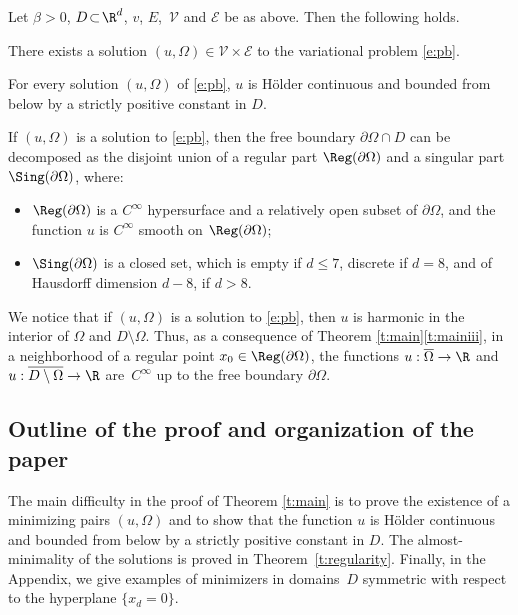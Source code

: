 \begin{teo}\label{t:main}
Let $\beta\!>\!0$, $D\!\subset\!\R^d$, $v$, $E$,~$\mathcal V$ and $\mathcal E$ be as above. Then the following holds.

\begin{enumeratei}
\item\label{t:maini} There exists a solution $(u,\Omega)\in\mathcal V\times\mathcal E$ to the variational problem \eqref{e:pb}.
\item For every solution $(u,\Omega)$ of \eqref{e:pb}, $u$ is Hölder continuous and bounded from below by a strictly positive constant in $D$.

\item\label{t:mainii} If $(u,\Omega)$ is a solution to \eqref{e:pb}, then the free boundary $\partial\Omega\cap D$ can be decomposed as the disjoint union of a regular part $\Reg(\partial\Omega)$ and a singular part $\Sing(\partial\Omega)$, where:
\begin{itemize}
\item\label{t:mainiii} $\Reg(\partial\Omega)$ is a $C^{\infty}$ hypersurface and a relatively open subset of $\partial\Omega$, and the function $u$ is $C^\infty$ smooth on $\Reg(\partial\Omega)$;
\item $\Sing(\partial\Omega)$ is a closed set, which is empty if $d\le 7$, discrete if $d=8$, and of Hausdorff dimension $d-8$, if $d>8$.
\end{itemize}
\end{enumeratei}
\end{teo}

\begin{oss}
We notice that if $(u,\Omega)$ is a solution to \eqref{e:pb}, then $u$ is harmonic in the interior of $\Omega$ and $D\setminus\Omega$. Thus, as a consequence of Theorem \ref{t:main}\eqref{t:mainiii}, in a neighborhood of a regular point $x_0\in\Reg(\partial\Omega)$, the functions $u:\overline\Omega\to\R$ and $u:\overline{D\setminus\Omega}\to\R$ are~$C^\infty$ up to the free boundary $\partial\Omega$.
\end{oss}

\subsection{Outline of the proof and organization of the paper}\label{sub:sketch}
The main difficulty in the proof of Theorem \ref{t:main} is to prove the existence of a minimizing pairs $(u,\Omega)$ and to show that the function $u$ is Hölder continuous and bounded from below by a strictly positive constant in $D$. The almost-minimality of the solutions is proved in Theorem~\ref{t:regularity}. Finally, in the Appendix, we give examples of minimizers in domains~$D$ symmetric with respect to the hyperplane $\{x_d=0\}$.

